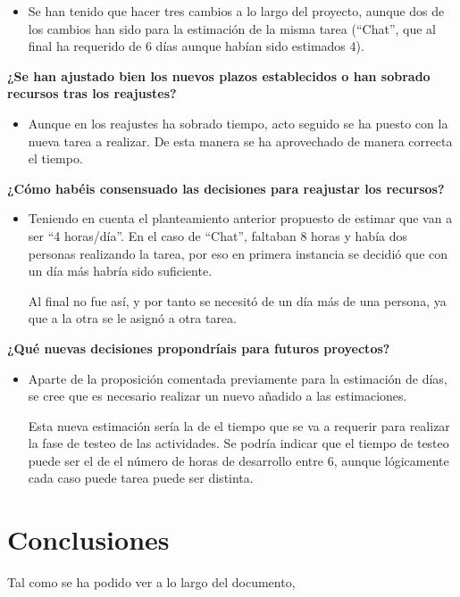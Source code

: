 \documentclass{\ClassPath/viu-tfm-template}
\begin{document}
\begin{itemize}
    \item Se han tenido que hacer tres cambios a lo largo del proyecto, aunque dos de los cambios han sido para la estimación de la misma tarea (“Chat”, que al final ha requerido de 6 días aunque habían sido estimados 4).
\end{itemize}


\textbf{¿Se han ajustado bien los nuevos plazos establecidos o han sobrado recursos tras los reajustes?}

\begin{itemize}
    \item Aunque en los reajustes ha sobrado tiempo, acto seguido se ha puesto con la nueva tarea a realizar. De esta manera se ha aprovechado de manera correcta el tiempo.
\end{itemize}


\textbf{¿Cómo habéis consensuado las decisiones para reajustar los recursos?}

\begin{itemize}
    \item Teniendo en cuenta el planteamiento anterior propuesto de estimar que van a ser “4 horas/día”. En el caso de “Chat”, faltaban 8 horas y había dos personas realizando la tarea, por eso en primera instancia se decidió que con un día más habría sido suficiente.

    Al final no fue así, y por tanto se necesitó de un día más de una persona, ya que a la otra se le asignó a otra tarea.
\end{itemize}

\textbf{¿Qué nuevas decisiones propondríais para futuros proyectos?}
\begin{itemize}
    \item Aparte de la proposición comentada previamente para la estimación de días, se cree que es necesario realizar un nuevo añadido a las estimaciones.

    Esta nueva estimación sería la de el tiempo que se va a requerir para realizar la fase de testeo de las actividades. Se podría indicar que el tiempo de testeo puede ser el de el número de horas de desarrollo entre 6, aunque lógicamente cada caso puede tarea puede ser distinta.
\end{itemize}



\chapter{Conclusiones}

Tal como se ha podido ver a lo largo del documento,
\end{document}
